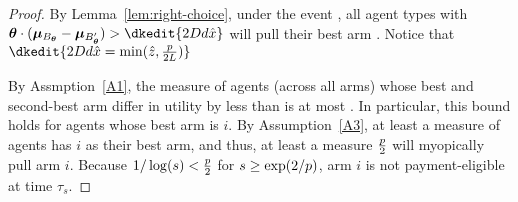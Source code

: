 \begin{proof}
By Lemma~\ref{lem:right-choice},
under the event ,
all agent types \AgV with
$\AgV \cdot (\ArmV{\Best{\AgV}} - \ArmV{\Second{\AgV}})
> \dkedit{2\Diam d \hat{x}}$
will pull their best arm \Best{\AgV}.
Notice that $\dkedit{2\Diam d \hat{x}
= \min(\TieCutoff, \frac{\MinProb}{2 \TieDensity})}$

By Assmption~\ref{A1},
the measure of agents (across all arms)
whose best and second-best arm differ in utility by less
than \dkedit{$\min(\TieCutoff, \frac{\MinProb}{2 \TieDensity})$}
is at most
.
In particular, this bound holds for agents whose best arm is $i$.
By Assumption~\ref{A3}, at least a measure \MinProb of agents has $i$
as their best arm, and thus, at least a measure $\frac{p}{2}$
will myopically pull arm $i$.
Because $1/\log(s) < \frac{p}{2}$ for
$s \geq \exp(2/p)$, arm $i$ is not payment-eligible at time
$\tau_s$.
\end{proof}